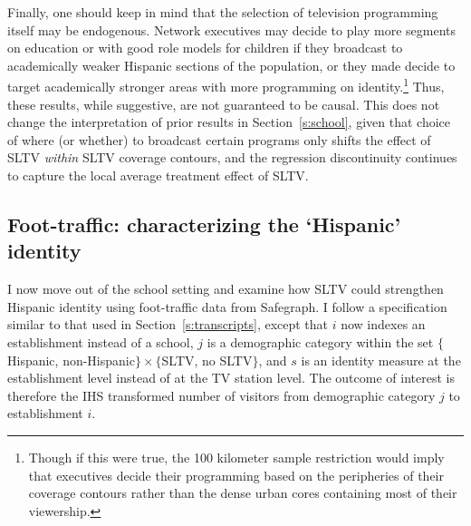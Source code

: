 \documentclass[11pt]{article}
\begin{document}
Finally, one should keep in mind that the selection of television programming itself may be endogenous. Network executives may decide to play more segments on education or with good role models for children if they broadcast to academically weaker Hispanic sections of the population, or they made decide to target academically stronger areas with more programming on identity.\footnote{ Though if this were true, the 100 kilometer sample restriction would imply that executives decide their programming based on the peripheries of their coverage contours rather than the dense urban cores containing most of their viewership.} Thus, these results, while suggestive, are not guaranteed to be causal. This does not change the interpretation of prior results in Section~\ref{s:school}, given that choice of where (or whether) to broadcast certain programs only shifts the effect of SLTV \textit{within} SLTV coverage contours, and the regression discontinuity continues to capture the local average treatment effect of SLTV.    


\subsection{Foot-traffic: characterizing the `Hispanic' identity}\label{s:safegraph}

I now move out of the school setting and examine how SLTV could strengthen Hispanic identity using foot-traffic data from Safegraph. I follow a specification similar to that used in Section~\ref{s:transcripts}, except that $i$ now indexes an establishment instead of a school, $j$ is a demographic category within the set $\{$Hispanic, non-Hispanic$\} \times  \{$SLTV, no SLTV$\}$, and $s$ is an identity measure at the establishment level instead of at the TV station level. The outcome of interest is therefore the IHS transformed number of visitors from demographic category $j$ to establishment $i$.
\end{document}
